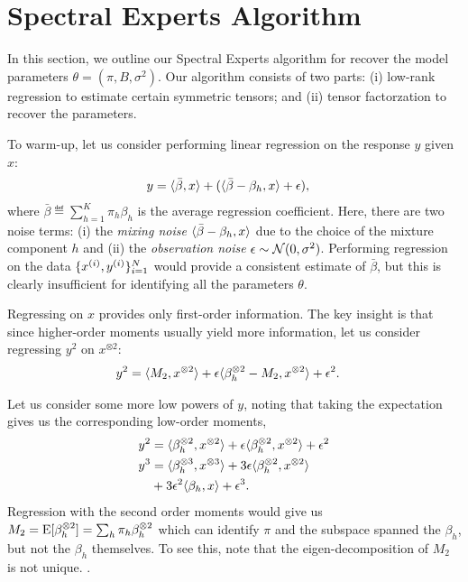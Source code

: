 \section{Spectral Experts Algorithm}
\label{sec:algo}

In this section, we outline our Spectral Experts algorithm
for recover the model parameters $\theta = (\pi, B, \sigma^2)$.
Our algorithm consists of two parts:
(i) low-rank regression to estimate certain symmetric tensors;
and (ii) tensor factorzation to recover the parameters.

To warm-up, let us consider performing linear regression
on the response $y$ given $x$:
\begin{align}
  y &= \langle \bar \beta, x \rangle + (\langle \bar\beta - \beta_h, x \rangle + \epsilon),
\end{align}
where $\bar\beta \eqdef \sum_{h=1}^K \pi_h \beta_h$ is the average regression coefficient.
Here, there are two noise terms:
(i) the \emph{mixing noise} $\langle \bar\beta - \beta_h, x \rangle$
due to the choice of the mixture component $h$
and (ii) the \emph{observation noise} $\epsilon \sim \mathcal{N}(0, \sigma^2)$.
Performing regression on the data $\{x^{(i)},
y^{(i)}\}_{i=1}^{N}$ would provide a consistent estimate of $\bar\beta$,
but this is clearly insufficient for identifying all the parameters $\theta$.

Regressing on $x$ provides only first-order
information.  The key insight is that
since higher-order moments usually yield more information,
let us consider regressing $y^2$ on $x^{\otimes 2}$:
\begin{align}
  y^2 &= \langle M_2, x^{\otimes 2} \rangle + \epsilon \langle \beta_h^{\otimes 2} - M_2, x^{\otimes 2} \rangle + \epsilon^2 \label{eq:y2}.
\end{align}

Let us consider some more low powers of $y$, noting
that taking the expectation gives us the corresponding low-order
moments,
\begin{align}
  y^2 &= \langle \beta_h^{\otimes 2}, x^{\otimes 2} \rangle + \epsilon \langle \beta_h^{\otimes 2}, x^{\otimes 2} \rangle + \epsilon^2 \label{eq:y2} \\ 
  y^3 &= \langle \beta_h^{\otimes 3}, x^{\otimes 3} \rangle + 3 \epsilon \langle \beta_h^{\otimes 2}, x^{\otimes 2} \rangle \notag \\
  &+ 3 \epsilon^2 \langle \beta_h, x \rangle + \epsilon^3. \label{eq:y3} 
\end{align}
Regression with the second order moments would give us $M_2 = \operatorname{E}[\beta_h
^{\otimes 2}] = \sum_h \pi_h \beta_h^{\otimes 2}$ which can identify $\pi$ and the
subspace spanned the $\beta_h$, but not the $\beta_h$ themselves. To see
this, note that the eigen-decomposition of $M_2$ is not unique.
.

